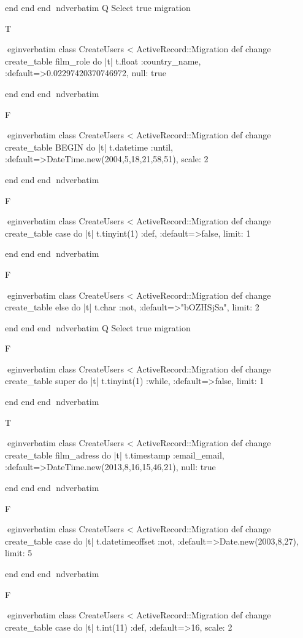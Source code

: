     end 
  end 
end
nd{verbatim}
Q
 Select true migration

T

egin{verbatim}
 class CreateUsers < ActiveRecord::Migration 
  def change 
    create_table film_role do |t| 
      t.float :country_name, :default=>0.02297420370746972, null: true
    
    end 
  end 
end
nd{verbatim}

F

egin{verbatim}
 class CreateUsers < ActiveRecord::Migration 
  def change 
    create_table BEGIN do |t| 
      t.datetime :until, :default=>DateTime.new(2004,5,18,21,58,51), scale: 2
    
    end 
  end 
end
nd{verbatim}

F

egin{verbatim}
 class CreateUsers < ActiveRecord::Migration 
  def change 
    create_table case do |t| 
      t.tinyint(1) :def, :default=>false, limit: 1
    
    end 
  end 
end
nd{verbatim}

F

egin{verbatim}
 class CreateUsers < ActiveRecord::Migration 
  def change 
    create_table else do |t| 
      t.char :not, :default=>"bOZHSjSa", limit: 2
    
    end 
  end 
end
nd{verbatim}
Q
 Select true migration

F

egin{verbatim}
 class CreateUsers < ActiveRecord::Migration 
  def change 
    create_table super do |t| 
      t.tinyint(1) :while, :default=>false, limit: 1
    
    end 
  end 
end
nd{verbatim}

T

egin{verbatim}
 class CreateUsers < ActiveRecord::Migration 
  def change 
    create_table film_adress do |t| 
      t.timestamp :email_email, :default=>DateTime.new(2013,8,16,15,46,21), null: true
    
    end 
  end 
end
nd{verbatim}

F

egin{verbatim}
 class CreateUsers < ActiveRecord::Migration 
  def change 
    create_table case do |t| 
      t.datetimeoffset :not, :default=>Date.new(2003,8,27), limit: 5
    
    end 
  end 
end
nd{verbatim}

F

egin{verbatim}
 class CreateUsers < ActiveRecord::Migration 
  def change 
    create_table case do |t| 
      t.int(11) :def, :default=>16, scale: 2
    
